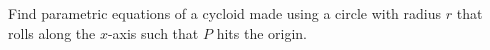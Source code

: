 \begin{frame}
\begin{example} %
Find parametric equations of a cycloid made using a circle with radius $r$ that rolls along the $x$-axis such that $P$ hits the origin.
\begin{columns}[c]





\end{columns}
\end{example}
\end{frame}
